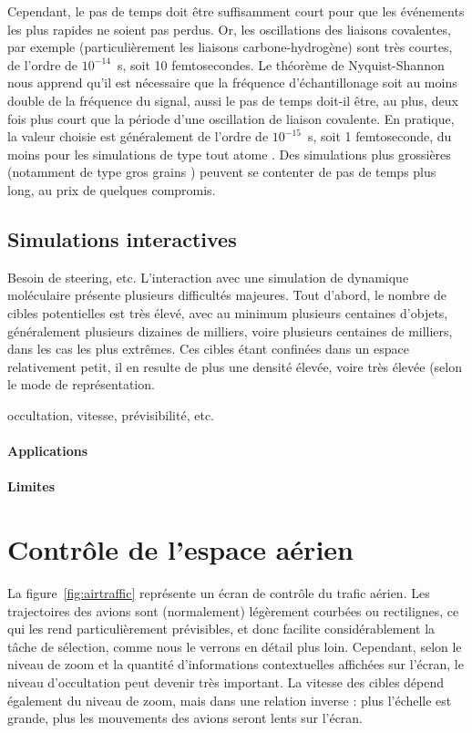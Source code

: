 	Cependant, le pas de temps doit être suffisamment court pour que les événements les plus rapides ne soient pas perdus. Or, les oscillations des liaisons covalentes, par exemple (particulièrement les liaisons carbone-hydrogène) sont très courtes, de l'ordre de $10^{-14}$~s, soit 10 femtosecondes. Le théorème de Nyquist-Shannon~\cite{shannon1949communication} nous apprend qu'il est nécessaire que la fréquence d'échantillonage soit au moins double de la fréquence du signal, aussi le pas de temps doit-il être, au plus, deux fois plus court que la période d'une oscillation de liaison covalente. En pratique, la valeur choisie est généralement de l'ordre de $10^{-15}$~s, soit 1 femtoseconde, du moins pour les simulations de type \og tout atome \fg{}. Des simulations plus grossières (notamment de type \og gros grains \fg{}) peuvent se contenter de pas de temps plus long, au prix de quelques compromis.
	
    
	\subsection{Simulations interactives}
	Besoin de steering, etc.
	L'interaction avec une simulation de dynamique moléculaire présente plusieurs difficultés majeures. Tout d'abord, le nombre de cibles potentielles est très élevé, avec au minimum plusieurs centaines d'objets, généralement plusieurs dizaines de milliers, voire plusieurs centaines de milliers, dans les cas les plus extrêmes. Ces cibles étant confinées dans un espace relativement petit, il en resulte de plus une densité élevée, voire très élevée (selon le mode de représentation.
	
	occultation, vitesse, prévisibilité, etc.
	 
    \paragraph{Applications}
    
    \paragraph{Limites}
	
	\section{Contrôle de l'espace aérien}
	La figure~\ref{fig:airtraffic} représente un écran de contrôle du trafic aérien. Les trajectoires des avions sont (normalement) légèrement courbées ou rectilignes, ce qui les rend particulièrement prévisibles, et donc facilite considérablement la tâche de sélection, comme nous le verrons en détail plus loin. Cependant, selon le niveau de zoom et la quantité d'informations contextuelles affichées sur l'écran, le niveau d'occultation peut devenir très important. La vitesse des cibles dépend également du niveau de zoom, mais dans une relation inverse : plus l'échelle est grande, plus les mouvements des avions seront lents sur l'écran.
	
